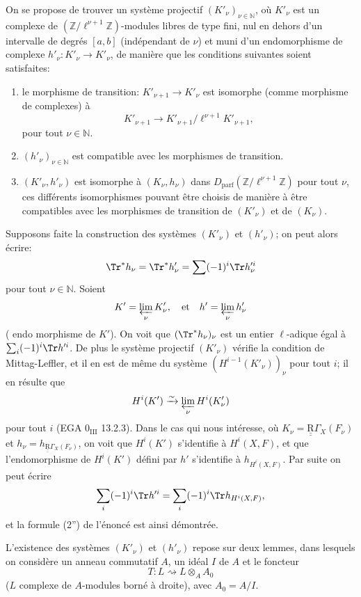 On se propose de trouver un système projectif $(K'_\nu)_{\nu\in\mathbb{N}}$, où $K'_\nu$ est un complexe de $(\mathbb{Z}/\ell^{\nu+1}\mathbb{Z})$-modules libres de type fini, nul en dehors d'un intervalle de degrés $[a,b]$ (indépendant de $\nu$) et muni d'un endomorphisme de complexe $h'_\nu:K'_\nu\to K'_\nu$, de manière que les conditions suivantes soient satisfaites:
\begin{enumerate}[label=\arabic*)]
\item le morphisme de transition: $K'_{\nu+1}\to K'_\nu$ est isomorphe (comme morphisme de complexes) à
\[
K'_{\nu+1}\to K'_{\nu+1}/\ell^{\nu+1}K'_{\nu+1},
\]
pour tout $\nu\in\mathbb{N}$.
\item $(h'_\nu)_{\nu\in\mathbb{N}}$ est compatible avec les morphismes de transition.
\item $(K'_\nu,h'_\nu)$ est isomorphe à $(K_\nu,h_\nu)$ dans $D_{\mathrm{parf}}(\mathbb{Z}/\ell^{\nu+1}\mathbb{Z})$ pour tout $\nu$, ces différents isomorphismes pouvant être choisis de manière à être compatibles avec les morphismes de transition de $(K'_\nu)$ et de $(K_\nu)$.
\end{enumerate}
Supposons faite la construction des systèmes $(K'_\nu)$ et $(h'_\nu)$; on peut alors écrire:
\[
\Tr^*h_\nu=\Tr^*h'_\nu=\sum(-1)^i\Tr h_\nu'^i
\]
pour tout $\nu\in\mathbb{N}$. Soient
\[
K'=\varprojlim_\nu K'_\nu,
\quad\text{et}\quad h'=\varprojlim_\nu h'_\nu
\]
(
endo%
morphisme de $K'$). On voit que $(\Tr^*h_\nu)_\nu$ est un entier $\ell$-adique égal à $\sum_i(-1)^i\Tr h'^i$. De plus le système projectif $(K'_\nu)$ vérifie la condition de Mittag-Leffler, et il en est de même du système $(H^{i-1}(K'_\nu))_\nu$ pour tout $i$; il en résulte que
\[
H^i(K')\xrightarrow{\sim}\varprojlim_\nu H^i(K'_\nu)
\]
pour tout $i$ (EGA $0_{\mathrm{III}}$ 13.2.3). Dans le cas qui nous intéresse, où $K_\nu=\underline{\underline{\mathrm{R}}}\Gamma_X(F_\nu)$ et $h_\nu=h_{\underline{\underline{\mathrm{R}}}\Gamma_X(F_\nu)}$, on voit que $H^i(K')$ s'identifie à $H^i(X,F)$, et que l'endomorphisme de $H^i(K')$ défini par $h'$ s'identifie à $h_{H^i(X,F)}$. Par suite on peut écrire
\[
\sum_i(-1)^i\Tr h'^i=
\sum_i(-1)^i\Tr h_{H^i(X,F)},
\]
et la formule (2'') de l'énoncé est ainsi démontrée.

L'existence des systèmes $(K'_\nu)$ et $(h'_\nu)$ repose sur deux lemmes, dans lesquels on considère un anneau commutatif $A$, un idéal $I$ de $A$ et le foncteur
\[
T:L\rightsquigarrow L\otimes_A A_0
\]
($L$ complexe de $A$-modules borné à droite), avec $A_0=A/I$.

